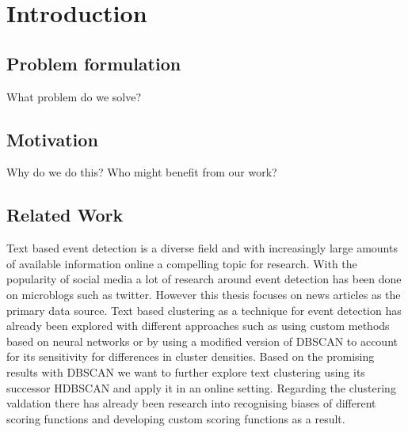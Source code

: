 \section{Introduction}

\subsection{Problem formulation}
What problem do we solve?


\subsection{Motivation}
Why do we do this?
Who might benefit from our work?


\subsection{Related Work}

Text based event detection is a diverse field and with increasingly large amounts of available information online a compelling topic for research. With the popularity of social media a lot of research around event detection has been done on microblogs\cite{microblog_clustering} such as twitter\cite{twitter_survey}\cite{social_media_survey}. However this thesis focuses on news articles as the primary data source. Text based clustering as a technique for event detection has already been explored with different approaches such as using custom methods based on neural networks\cite{text_clustering_topic_detection} or by using a modified version of DBSCAN to account for its sensitivity for differences in cluster densities\cite{dbscan_martingale}. Based on the promising results with DBSCAN we want to further explore text clustering using its successor HDBSCAN\cite{McInnes2017} and apply it in an online setting. Regarding the clustering valdation there has already been research into recognising biases of different scoring functions \cite{Wu:2009:ARM:1557019.1557115} and developing custom scoring functions as a result\cite{gates2017comparing}.